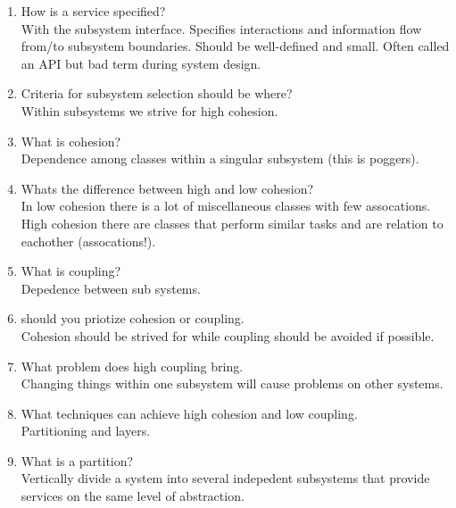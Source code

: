 \documentclass[10pt]{article}
\begin{document}
\begin{enumerate}
      \item How is a service specified?\\
            With the subsystem interface. Specifies interactions and information flow from/to subsystem boundaries. Should be
            well-defined and small. Often called an API but bad term during system design.\\

      \item Criteria for subsystem selection should be where?\\
            Within subsystems we strive for high cohesion.\\

      \item What is cohesion?\\
            Dependence among classes within a singular subsystem (this is poggers).\\
      \item Whats the difference between high and low cohesion?\\
            In low cohesion there is a lot of miscellaneous classes with few assocations. High cohesion there are classes that perform similar tasks
            and are relation to eachother (assocations!).

      \item What is coupling?\\
            Depedence between sub systems.

      \item should you priotize cohesion or coupling.\\
            Cohesion should be strived for while coupling should be avoided if possible.

      \item What problem does high coupling bring.\\
            Changing things within one subsystem will cause problems on other systems.\\

      \item What techniques can achieve high cohesion and low coupling.\\
            Partitioning and layers.\\

      \item What is a partition?\\
            Vertically divide a system into several indepedent subsystems that provide services on the same level of abstraction.\\


\end{enumerate}
\end{document}
